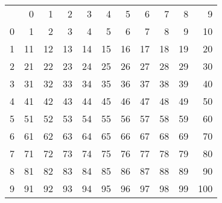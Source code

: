 \begin{tabular}{lrrrrrrrrrr}
 & 0 & 1 & 2 & 3 & 4 & 5 & 6 & 7 & 8 & 9 \\
0 & 1 & 2 & 3 & 4 & 5 & 6 & 7 & 8 & 9 & 10 \\
1 & 11 & 12 & 13 & 14 & 15 & 16 & 17 & 18 & 19 & 20 \\
2 & 21 & 22 & 23 & 24 & 25 & 26 & 27 & 28 & 29 & 30 \\
3 & 31 & 32 & 33 & 34 & 35 & 36 & 37 & 38 & 39 & 40 \\
4 & 41 & 42 & 43 & 44 & 45 & 46 & 47 & 48 & 49 & 50 \\
5 & 51 & 52 & 53 & 54 & 55 & 56 & 57 & 58 & 59 & 60 \\
6 & 61 & 62 & 63 & 64 & 65 & 66 & 67 & 68 & 69 & 70 \\
7 & 71 & 72 & 73 & 74 & 75 & 76 & 77 & 78 & 79 & 80 \\
8 & 81 & 82 & 83 & 84 & 85 & 86 & 87 & 88 & 89 & 90 \\
9 & 91 & 92 & 93 & 94 & 95 & 96 & 97 & 98 & 99 & 100 \\
\end{tabular}
